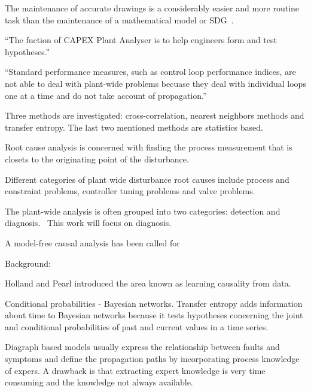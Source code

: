 The maintenance of accurate drawings is a considerably easier and more routine task than the maintenance of a mathematical model or SDG~\cite{Yim2006}.

``The fuction of CAPEX Plant Analyser is to help engineers form and test hypotheses.''~\cite{Yim2006}

``Standard performance measures, such as control loop performance indices, are not able to deal with plant-wide problems becuase they deal with individual loops one at a time and do not take account of propagation.''~\cite{Bauer2008}



Three methods are investigated: cross-correlation, nearest neighbors methods and transfer entropy.
The last two mentioned methods are statistics based.

Root cause analysis is concerned with finding the process measurement that is closets to the originating point of the disturbance.

Different categories of plant wide disturbance root causes include process and constraint problems, controller tuning problems and valve problems. %






The plant-wide analysis is often grouped into two categories: detection and diagnosis.~\cite{Bauer2008} %
This work will focus on diagnosis.

A model-free causal analysis has been called for~\cite{Bauer2008} %

Background:

Holland and Pearl introduced the area known as learning causality from data.

Conditional probabilities - Bayesian networks.
Transfer entropy adds information about time to Bayesian networks because it tests hypotheses concerning the joint and conditional probabilities of past and current values in a time series.






Diagraph based models usually express the relationship between faults and symptoms and define the propagation paths by incorporating process knowledge of expers.
A drawback is that extracting expert knowledge is very time consuming and the knowledge not always available.

